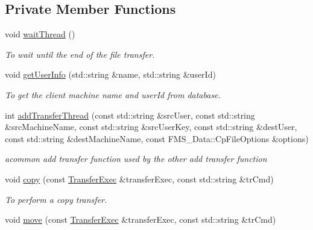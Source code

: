 \subsection*{Private Member Functions}
\begin{DoxyCompactItemize}
\item 
\hypertarget{classFileTransferServer_aed6e23958cb695eb11b96b33e2a23112}{
void \hyperlink{classFileTransferServer_aed6e23958cb695eb11b96b33e2a23112}{waitThread} ()}
\label{classFileTransferServer_aed6e23958cb695eb11b96b33e2a23112}

\begin{DoxyCompactList}\small\item\em To wait until the end of the file transfer. \item\end{DoxyCompactList}\item 
void \hyperlink{classFileTransferServer_ab150718ba4db1dd89a398f8a97325872}{getUserInfo} (std::string \&name, std::string \&userId)
\begin{DoxyCompactList}\small\item\em To get the client machine name and userId from database. \item\end{DoxyCompactList}\item 
int \hyperlink{classFileTransferServer_a865f8450b3fcf73b7596c04bd51bbcb0}{addTransferThread} (const std::string \&srcUser, const std::string \&srcMachineName, const std::string \&srcUserKey, const std::string \&destUser, const std::string \&destMachineName, const FMS\_\-Data::CpFileOptions \&options)
\begin{DoxyCompactList}\small\item\em acommon add transfer function used by the other add transfer function \item\end{DoxyCompactList}\item 
void \hyperlink{classFileTransferServer_aa791e828eb3aa23f3935273bed57af3b}{copy} (const \hyperlink{classTransferExec}{TransferExec} \&transferExec, const std::string \&trCmd)
\begin{DoxyCompactList}\small\item\em To perform a copy transfer. \item\end{DoxyCompactList}\item 
void \hyperlink{classFileTransferServer_a0825a813c09aaa4c63de51716ac440fd}{move} (const \hyperlink{classTransferExec}{TransferExec} \&transferExec, const std::string \&trCmd)

\end{DoxyCompactItemize}
